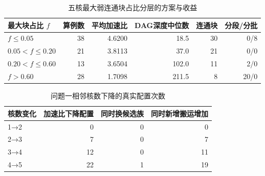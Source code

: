 \begin{table}[htbp]\centering
\caption{五核最大弱连通块占比分层的方案与收益}\label{tab:q1-structure-deep}
\small\begin{tabular}{lrrrrr}\toprule
最大块占比 $f$ & 算例数 & 平均加速比 & DAG深度中位数 & 连通块 & 分段/分批 \\ \midrule
$f\leq0.05$ & 38 & 4.6200 & 18.5 & 30 & 0/8 \\
$0.05<f\leq0.20$ & 21 & 3.8113 & 37.0 & 21 & 0/0 \\
$0.20<f\leq0.60$ & 13 & 3.6504 & 102.0 & 11 & 2/0 \\
$f>0.60$ & 28 & 1.7098 & 211.5 & 8 & 20/0 \\
\bottomrule\end{tabular}\end{table}
\begin{table}[htbp]\centering
\caption{问题一相邻核数下降的真实配置次数}\label{tab:q1-nonmonotone-deep}
\small\begin{tabular}{lrrr}\toprule
核数变化 & 加速比下降配置 & 同时换候选族 & 同时新增搬运增加 \\ \midrule
1→2 & 0 & 0 & 0 \\
2→3 & 7 & 0 & 7 \\
3→4 & 12 & 0 & 11 \\
4→5 & 22 & 1 & 19 \\
\bottomrule\end{tabular}\end{table}
